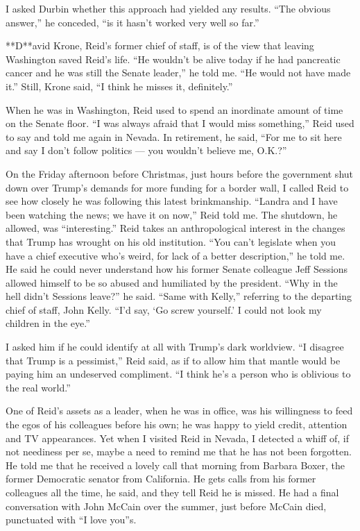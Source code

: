 I asked Durbin whether this approach had yielded any results. ``The
obvious answer,'' he conceded, ``is it hasn't worked very well so far.''

**D**avid Krone, Reid's former chief of staff, is of the view that
leaving Washington saved Reid's life. ``He wouldn't be alive today if he
had pancreatic cancer and he was still the Senate leader,'' he told me.
``He would not have made it.'' Still, Krone said, ``I think he misses
it, definitely.''

When he was in Washington, Reid used to spend an inordinate amount of
time on the Senate floor. ``I was always afraid that I would miss
something,'' Reid used to say and told me again in Nevada. In
retirement, he said, ``For me to sit here and say I don't follow
politics --- you wouldn't believe me, O.K.?''

On the Friday afternoon before Christmas, just hours before the
government shut down over Trump's demands for more funding for a border
wall, I called Reid to see how closely he was following this latest
brinkmanship. ``Landra and I have been watching the news; we have it on
now,'' Reid told me. The shutdown, he allowed, was ``interesting.'' Reid
takes an anthropological interest in the changes that Trump has wrought
on his old institution. ``You can't legislate when you have a chief
executive who's weird, for lack of a better description,'' he told me.
He said he could never understand how his former Senate colleague Jeff
Sessions allowed himself to be so abused and humiliated by the
president. ``Why in the hell didn't Sessions leave?'' he said. ``Same
with Kelly,'' referring to the departing chief of staff, John Kelly.
``I'd say, `Go screw yourself.' I could not look my children in the
eye.''

I asked him if he could identify at all with Trump's dark worldview. ``I
disagree that Trump is a pessimist,'' Reid said, as if to allow him that
mantle would be paying him an undeserved compliment. ``I think he's a
person who is oblivious to the real world.''

One of Reid's assets as a leader, when he was in office, was his
willingness to feed the egos of his colleagues before his own; he was
happy to yield credit, attention and TV appearances. Yet when I visited
Reid in Nevada, I detected a whiff of, if not neediness per se, maybe a
need to remind me that he has not been forgotten. He told me that he
received a lovely call that morning from Barbara Boxer, the former
Democratic senator from California. He gets calls from his former
colleagues all the time, he said, and they tell Reid he is missed. He
had a final conversation with John McCain over the summer, just before
McCain died, punctuated with ``I love you''s.

